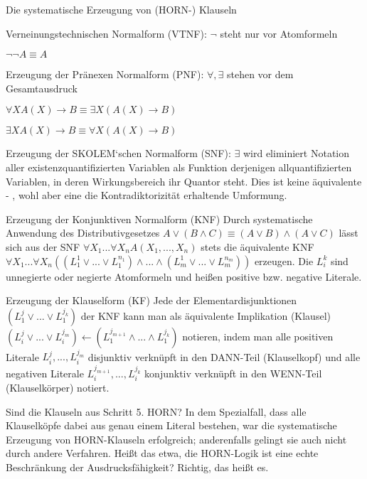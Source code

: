 \documentclass[a4paper]{article}
\begin{document}
\begin{multicols}{3}
  Die systematische Erzeugung von (HORN-) Klauseln
  \begin{enumerate*}
    \item Verneinungstechnischen Normalform (VTNF): $\lnot$ steht nur vor Atomformeln
    \begin{itemize*}
      \item $\lnot\lnot A\equiv A$
    \end{itemize*}
    \item Erzeugung der Pränexen Normalform (PNF): $\forall, \exists$ stehen vor dem Gesamtausdruck
    \begin{itemize*}
      \item $\forall X A(X) \rightarrow B \equiv \exists X(A(X)\rightarrow B)$
      \item $\exists X A(X) \rightarrow B \equiv \forall X(A(X)\rightarrow B)$
    \end{itemize*}
    \item Erzeugung der SKOLEM‘schen Normalform (SNF): $\exists$ wird eliminiert
    Notation aller existenzquantifizierten Variablen als Funktion derjenigen allquantifizierten Variablen, in deren Wirkungsbereich ihr Quantor steht. Dies ist keine äquivalente - , wohl aber eine die Kontradiktorizität erhaltende Umformung.
    \item Erzeugung der Konjunktiven Normalform (KNF)
    Durch systematische Anwendung des Distributivgesetzes $A\vee (B\wedge C)\equiv (A\vee B)\wedge(A\vee C)$ lässt sich aus der SNF $\forall X_1...\forall X_n A(X_1,...,X_n)$ stets die äquivalente KNF $\forall X_1...\forall X_n((L_1^1\vee...\vee L_1^{n_1})\wedge...\wedge(L_m^1\vee...\vee L_m^{n_m}))$ erzeugen. Die $L_i^k$ sind unnegierte oder negierte Atomformeln und heißen positive bzw. negative Literale.
    \item Erzeugung der Klauselform (KF)
    Jede der Elementardisjunktionen $(L_1^j \vee...\vee L_1^{j_k})$ der KNF kann man als äquivalente Implikation (Klausel) $(L_i^j \vee...\vee L_i^{j_m})\leftarrow(L_1^{j_{m+1}}\wedge ...\wedge L_1^{j_k})$ notieren, indem man alle positiven Literale $L_i^j,...,L_i^{j_m}$ disjunktiv verknüpft in den DANN-Teil (Klauselkopf) und alle negativen Literale $L_i^{j_{m+1}},...,L_i^{j_k}$ konjunktiv verknüpft in den WENN-Teil (Klauselkörper) notiert.
    \item Sind die Klauseln aus Schritt 5. HORN?
    In dem Spezialfall, dass alle Klauselköpfe dabei aus genau einem Literal bestehen, war die systematische Erzeugung von HORN-Klauseln erfolgreich; anderenfalls gelingt sie auch nicht durch andere Verfahren.
    Heißt das etwa, die HORN-Logik ist eine echte Beschränkung der Ausdrucksfähigkeit? Richtig, das heißt es.
  \end{enumerate*}


\end{multicols}
\end{document}
